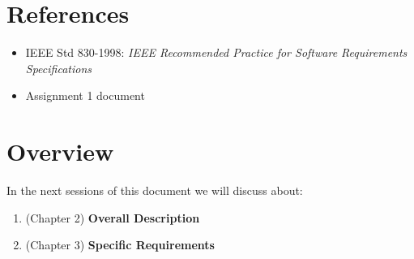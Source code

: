 \section{References}
\begin{itemize}
\item IEEE Std 830-1998: \textit{IEEE Recommended Practice for Software Requirements Specifications}
\item Assignment 1 document
\end{itemize}
\section{Overview}
In the next sessions of this document we will discuss about:
\begin{enumerate}
\item (Chapter 2) \textbf{Overall Description}
\item (Chapter 3) \textbf{Specific Requirements}
\end{enumerate}
